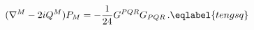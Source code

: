 \begin{equation}
(\nabla^M -2 i Q^M) P_M= -\frac{1}{ 24} G^{PQR}G_{PQR}\,.
\eqlabel{tengsq}
\end{equation}

